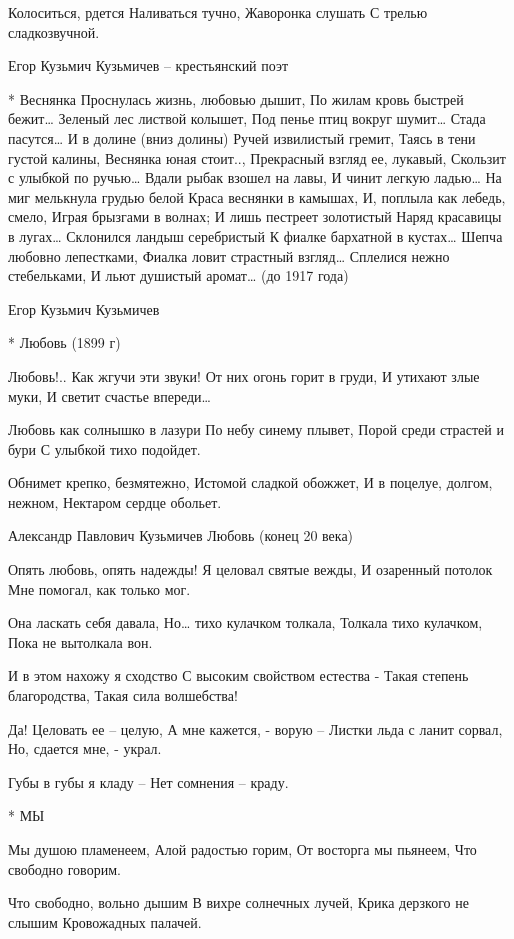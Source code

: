 Колоситься, рдется
     Наливаться тучно,
Жаворонка слушать
     С трелью сладкозвучной.

Егор Кузьмич Кузьмичев – крестьянский поэт


* Веснянка
Проснулась жизнь, любовью дышит,
    По жилам кровь быстрей бежит…
Зеленый лес листвой колышет,
   Под пенье птиц вокруг шумит…
Стада пасутся… И в долине (вниз долины)
    Ручей извилистый гремит,
Таясь в тени густой калины,
    Веснянка юная стоит..,
Прекрасный взгляд ее, лукавый,
    Скользит с улыбкой по ручью…
Вдали рыбак взошел на лавы,
    И чинит легкую ладью…
На миг мелькнула грудью белой
    Краса веснянки в камышах,
И, поплыла как лебедь, смело,
    Играя брызгами в волнах;
И лишь пестреет золотистый
    Наряд красавицы в лугах…
Склонился ландыш серебристый
    К фиалке бархатной в кустах…
Шепча любовно лепестками,
    Фиалка ловит страстный взгляд…
Сплелися нежно стебельками,
    И льют душистый  аромат…
(до 1917 года)

Егор Кузьмич Кузьмичев


* Любовь (1899 г)

Любовь!.. Как жгучи эти звуки!
От них огонь горит в груди,
И утихают злые муки,
И светит счастье впереди…

Любовь как солнышко в лазури
По небу синему плывет,
Порой среди страстей и бури
С улыбкой тихо подойдет.

Обнимет крепко, безмятежно,
Истомой сладкой обожжет,
И в поцелуе, долгом, нежном,
Нектаром сердце обольет.

Александр Павлович Кузьмичев
Любовь (конец 20 века)

Опять любовь, опять надежды!
Я целовал святые вежды,
И озаренный потолок
Мне помогал, как только мог.

Она ласкать себя давала,
Но… тихо кулачком толкала,
Толкала тихо кулачком,
Пока не вытолкала вон.

И в этом нахожу я сходство
С высоким свойством естества -
Такая степень благородства,
Такая сила волшебства!

Да! Целовать ее – целую,
А мне кажется, - ворую –
Листки льда с ланит сорвал,
Но, сдается мне, - украл.

Губы в губы я кладу –
Нет сомнения – краду.


* МЫ

Мы душою пламенеем,
Алой радостью горим,
От восторга мы пьянеем,
Что свободно говорим.

Что свободно, вольно дышим
В вихре солнечных лучей,
Крика дерзкого не слышим
Кровожадных палачей.

